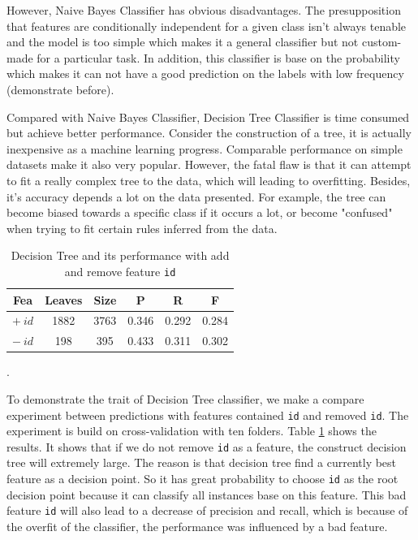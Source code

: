 \documentclass[11pt]{article}
\begin{document}
However, Naive Bayes Classifier has obvious disadvantages. The presupposition that features are conditionally independent for a given class isn't always tenable and the model is too simple which makes it a general classifier but not custom-made for a particular task. In addition, this classifier is base on the probability which makes it can not have a good prediction on the labels with low frequency (demonstrate before).

Compared with Naive Bayes Classifier, Decision Tree Classifier is time consumed but  achieve better performance. Consider the  construction of a tree, it is actually inexpensive as a machine learning progress. Comparable performance on simple datasets make it also very popular. However, the fatal flaw is that it can attempt to fit a really complex tree to the data, which will leading to overfitting. Besides, it's accuracy depends a lot on the data presented. For example, the tree can become biased towards a specific class if it occurs a lot, or become "confused" when trying to fit certain rules inferred from the data. 

\begin{table}[h]
	\centering
	\begin{tabular}{c|cc|ccc}
		\hline
		\textbf{Fea} & \textbf{Leaves} & \textbf{Size} & \textbf{P} & \textbf{R} & \textbf{F}  \\
		\hline
		$+\ id$ & 1882 & 3763 & 0.346   &  0.292  &  0.284  \\
		$-\ id$ & 198 & 395 & 0.433  &   0.311  &  0.302   \\
		\hline
	\end{tabular}
	\caption{Decision Tree and its performance with add and remove feature \texttt{id}}.
	\label{tab:5}
\end{table}
	
To demonstrate the trait of Decision Tree classifier, we make a compare experiment between predictions with features contained \texttt{id} and removed \texttt{id}. The experiment is build on cross-validation with ten folders. Table \ref{tab:5} shows the results. It shows that if we do not remove \texttt{id} as a feature, the construct decision tree will extremely large. The reason is that decision tree find a currently best feature as a decision point. So it has great probability to choose \texttt{id} as the root decision point because it can classify all instances base on this feature. This bad feature \texttt{id} will also lead to a decrease of precision and recall, which is because of the overfit of the classifier, the performance was influenced by a bad feature.
\end{document}
